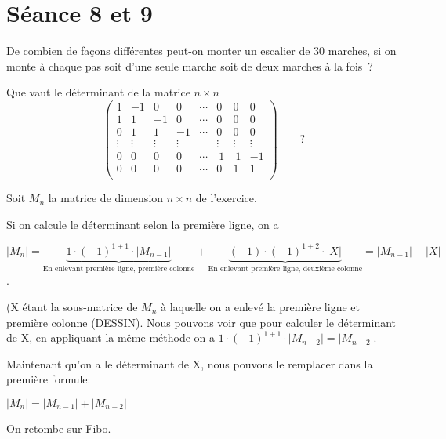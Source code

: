 \section{Séance 8 et 9}

\begin{exo}
De combien de fa\c{c}ons diff\'erentes peut-on monter un escalier de 30 marches, si on monte \`a chaque pas soit d'une seule marche soit de deux marches \`a la fois~?
\end{exo}


\begin{exo} 
Que vaut le d\'eterminant de la matrice $n \times n$ 
\[
\left( 
\begin{array}{rrrrrrrr}
1 &-1 &0  &0  &\cdots &0 &0 &0\\
1 & 1 &-1 &0  &\cdots &0 &0 &0\\
0 & 1 &1  &-1 &\cdots &0 &0 &0\\
\vdots & \vdots & \vdots & \vdots && \vdots & \vdots &\vdots\\
0 & 0 & 0 & 0 & \cdots & ~1 &~1 &-1\\
0 & 0 & 0 & 0 & \cdots & 0 &1 &1\\
\end{array}
\right) \qquad ?
\]
\end{exo}

Soit $M_n$ la matrice de dimension $n\times n$ de l'exercice.

Si on calcule le déterminant selon la première ligne, on a 

\[|M_n| = \underbrace{1\cdot (-1)^{1+1} \cdot |M_{n-1}|}_{\text{En enlevant première ligne, première colonne}} + \underbrace{(-1) \cdot (-1)^{1+2} \cdot |X|}_{\text{En enlevant première ligne, deuxième colonne}} = |M_{n-1}| + |X|\].

(X étant la sous-matrice de $M_n$ à laquelle on a enlevé la première ligne et première colonne (DESSIN). Nous pouvons voir que pour calculer le déterminant de X, en appliquant la même méthode on a $1 \cdot (-1)^{1+1} \cdot |M_{n-2}| = |M_{n-2}|$.

Maintenant qu'on a le déterminant de X, nous pouvons le remplacer dans la première formule:

$|M_{n}| = |M_{n-1}| + |M_{n-2}|$

On retombe sur Fibo.


